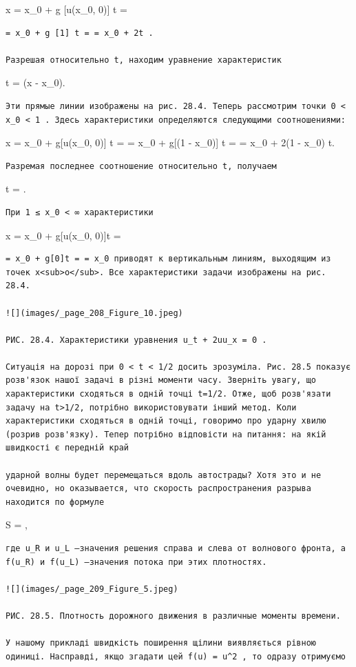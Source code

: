 \documentclass[
  ukrainian,
]{article}
\begin{document}
x = x\_0 + g {[}u(x\_0, 0){]} t =

\begin{verbatim}
= x_0 + g [1] t = = x_0 + 2t .

Разрешая относительно t, находим уравнение характеристик
\end{verbatim}

t =  (x - x\_0).

\begin{verbatim}
Эти прямые линии изображены на рис. 28.4. Теперь рассмотрим точки 0 < x_0 < 1 . Здесь характеристики определяются следующими соотношениями:
\end{verbatim}

x = x\_0 + g{[}u(x\_0, 0){]} t = = x\_0 + g{[}(1 - x\_0){]} t = = x\_0 +
2(1 - x\_0) t.

\begin{verbatim}
Разремая последнее соотношение относительно t, получаем
\end{verbatim}

t = .

\begin{verbatim}
При 1 ≤ x_0 < ∞ характеристики
\end{verbatim}

x = x\_0 + g{[}u(x\_0, 0){]}t =

\begin{verbatim}
= x_0 + g[0]t = = x_0 приводят к вертикальным линиям, выходящим из точек х<sub>о</sub>. Все характеристики задачи изображены на рис. 28.4.

![](images/_page_208_Figure_10.jpeg)

РИС. 28.4. Характеристики уравнения u_t + 2uu_x = 0 .

Ситуація на дорозі при 0 < t < 1/2 досить зрозуміла. Рис. 28.5 показує розв'язок нашої задачі в різні моменти часу. Зверніть увагу, що характеристики сходяться в одній точці t=1/2. Отже, щоб розв'язати задачу на t>1/2, потрібно використовувати інший метод. Коли характеристики сходяться в одній точці, говоримо про ударну хвилю (розрив розв'язку). Тепер потрібно відповісти на питання: на якій швидкості є передній край

ударной волны будет перемещаться вдоль автострады? Хотя это и не очевидно, но оказывается, что скорость распространения разрыва находится по формуле
\end{verbatim}

S = ,

\begin{verbatim}
где u_R и u_L —значения решения справа и слева от волнового фронта, а f(u_R) и f(u_L) —значения потока при этих плотностях.

![](images/_page_209_Figure_5.jpeg)

РИС. 28.5. Плотность дорожного движения в различные моменты времени.

У нашому прикладі швидкість поширення щілини виявляється рівною одиниці. Насправді, якщо згадати цей f(u) = u^2 , то одразу отримуємо
\end{verbatim}
\end{document}
